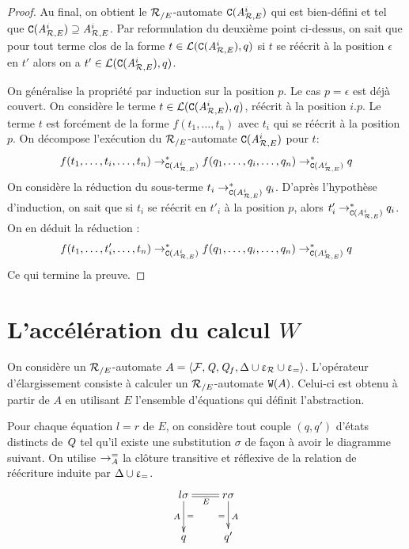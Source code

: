 \begin{proof}
  
  Au final, on obtient le ${\mathcal R_{/E}}$-automate $\mathtt{C}({\mathit A}_{\mathcal R,E}^i)$ qui est bien-défini et tel que $\mathtt{C}({\mathit A}_{\mathcal R,E}^i) \supseteq {\mathit A}_{\mathcal R,E}^i$.
  Par reformulation du deuxième point ci-dessus, on sait que pour tout terme clos de la forme $t \in \mathcal{L}(\mathtt{C}({\mathit A}_{\mathcal R,E}^i),q)$ si $t$ se réécrit à la position $\epsilon$
  en $t'$ alors on a $t' \in \mathcal{L}(\mathtt{C}({\mathit A}_{\mathcal R,E}^i),q)$.

  On généralise la propriété par induction sur la position $p$. Le cas $p = \epsilon$ est déjà couvert.
  On considère le terme $t \in \mathcal{L}(\mathtt{C}({\mathit A}_{\mathcal R,E}^i),q)$, réécrit à la position $i.p$. Le terme $t$
  est forcément de la forme $f(t_1, \dots, t_n)$ avec $t_i$ qui se réécrit à la position $p$.
  On décompose l'exécution du ${\mathcal R_{/E}}$-automate $\mathtt{C}({\mathit A}_{\mathcal R,E}^i)$ pour $t$:
  \[ f(t_1, \dots,t_i, \dots,t_n) \rightarrow^*_{\mathtt{C}({\mathit A}_{\mathcal R,E}^i)} f(q_1, \dots,q_i, \dots,q_n) \rightarrow^*_{\mathtt{C}({\mathit A}_{\mathcal R,E}^i)} q \]
  On considère la réduction du sous-terme $t_i \rightarrow^*_{\mathtt{C}({\mathit A}_{\mathcal R,E}^i)} q_i$. D'après l'hypothèse d'induction,
  on sait que si $t_i$ se réécrit en $t'_i$ à la position $p$, alors $t'_i\rightarrow^*_{\mathtt{C}({\mathit A}_{\mathcal R,E}^i)} q_i$. 
  On en déduit la réduction :
  \[ f(t_1, \dots, t'_i, \dots,t_n) \rightarrow^*_{\mathtt{C}({\mathit A}_{\mathcal R,E}^i)} f(q_1, \dots,q_i, \dots,q_n) \rightarrow^*_{\mathtt{C}({\mathit A}_{\mathcal R,E}^i)} q \]
  Ce qui termine la preuve.
\end{proof}


\section{L'accélération du calcul $W$}

On considère un ${\mathcal R_{/E}}$-automate $A = \langle \mathcal{F}, \mathit Q, \mathit Q_f, \Delta \cup \upvarepsilon_{\mathcal R}
\cup \upvarepsilon_{=} \rangle$. L'opérateur d'élargissement consiste à calculer un 
${\mathcal R_{/E}}$-automate $\mathtt{W}(A)$. Celui-ci est obtenu à partir de $A$ en utilisant $E$
l'ensemble d'équations qui définit l'abstraction.

Pour chaque équation $l = r$ de $E$, on considère tout couple
$(q, q')$ d'états distincts de $\mathit Q$ tel qu'il existe une
substitution $\sigma$ de façon à avoir le diagramme suivant.
On utilise $\rightarrow^=_{A}$ la clôture transitive et réflexive
de la relation de réécriture induite par $\Delta \cup \upvarepsilon_{=}$.  
\[\xymatrix{
  l\sigma \ar@{=}[r]_{E}\ar[d]^{=}_{A} & r\sigma \ar[d]^{A}_{=}\\
  q & q'
}\]

